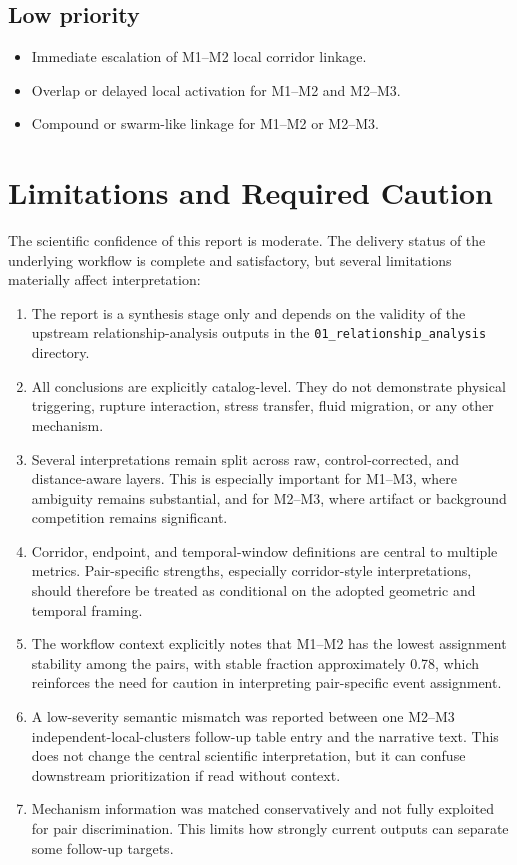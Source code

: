 \documentclass[11pt]{article}
\begin{document}
\subsection*{Low priority}
\begin{itemize}
    \item Immediate escalation of M1--M2 local corridor linkage.
    \item Overlap or delayed local activation for M1--M2 and M2--M3.
    \item Compound or swarm-like linkage for M1--M2 or M2--M3.
\end{itemize}

\section{Limitations and Required Caution}
The scientific confidence of this report is moderate. The delivery status of the underlying workflow is complete and satisfactory, but several limitations materially affect interpretation:
\begin{enumerate}
    \item The report is a synthesis stage only and depends on the validity of the upstream relationship-analysis outputs in the \texttt{01\_relationship\_analysis} directory.
    \item All conclusions are explicitly catalog-level. They do not demonstrate physical triggering, rupture interaction, stress transfer, fluid migration, or any other mechanism.
    \item Several interpretations remain split across raw, control-corrected, and distance-aware layers. This is especially important for M1--M3, where ambiguity remains substantial, and for M2--M3, where artifact or background competition remains significant.
    \item Corridor, endpoint, and temporal-window definitions are central to multiple metrics. Pair-specific strengths, especially corridor-style interpretations, should therefore be treated as conditional on the adopted geometric and temporal framing.
    \item The workflow context explicitly notes that M1--M2 has the lowest assignment stability among the pairs, with stable fraction approximately 0.78, which reinforces the need for caution in interpreting pair-specific event assignment.
    \item A low-severity semantic mismatch was reported between one M2--M3 independent-local-clusters follow-up table entry and the narrative text. This does not change the central scientific interpretation, but it can confuse downstream prioritization if read without context.
    \item Mechanism information was matched conservatively and not fully exploited for pair discrimination. This limits how strongly current outputs can separate some follow-up targets.
\end{enumerate}
\end{document}
